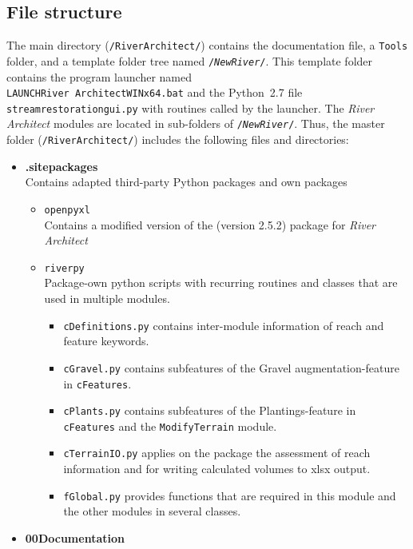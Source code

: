 \subsection{File structure}
The main directory (\texttt{/RiverArchitect/}) contains the documentation file, a \texttt{Tools} folder, and a template folder tree named \texttt{/\textit{NewRiver}/}. This template folder contains the program launcher named\\ \texttt{LAUNCH{\myUnderscore}River Architect{\myUnderscore}WINx64.bat} and the Python~2.7 file \texttt{stream{\myUnderscore}restoration{\myUnderscore}gui.py} with routines called by the launcher. The \textit{River Architect} modules are located in sub-folders of \texttt{/\textit{NewRiver}/}. Thus, the master folder (\texttt{/RiverArchitect/}) includes the following files and directories:
\begin{itemize}
	\item \textbf{.site{\myUnderscore}packages}\\
	Contains adapted third-party Python packages and own packages
	\begin{itemize}
		\item \texttt{openpyxl}\\
		Contains a modified version of the  (version 2.5.2) package for \textit{River Architect}
		\item \texttt{riverpy}\\
		Package-own python scripts with recurring routines and classes that are used in multiple modules.
		\begin{itemize}		
			\item \texttt{cDefinitions.py} contains inter-module information of reach and feature keywords.
			\item \texttt{cGravel.py} contains subfeatures of the Gravel augmentation-feature in \texttt{cFeatures}.
			\item \texttt{cPlants.py} contains subfeatures of the Plantings-feature in \texttt{cFeatures} and the \texttt{ModifyTerrain} module.
			\item \texttt{cTerrainIO.py} applies on the  package the assessment of reach information and for writing calculated volumes to xlsx output.
			\item \texttt{fGlobal.py} provides functions that are required in this module and the other modules in several classes.
		\end{itemize}
	\end{itemize}
	\item \textbf{00{\myUnderscore}Documentation}\\

\end{itemize}

